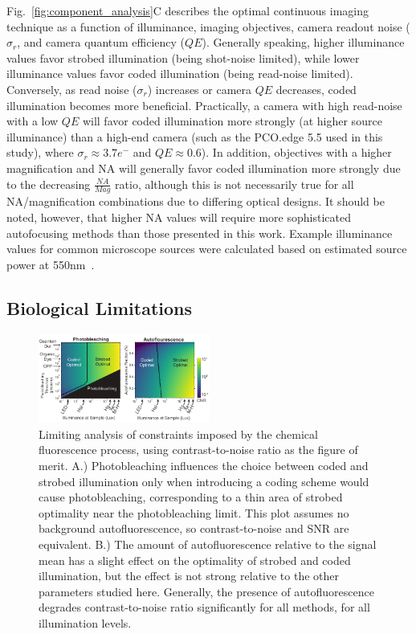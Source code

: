 Fig.~\ref{fig:component_analysis}C describes the optimal continuous imaging technique as a function of illuminance, imaging objectives, camera readout noise ($\sigma_r$, and camera quantum efficiency ($QE$). Generally speaking, higher illuminance values favor strobed illumination (being shot-noise limited), while lower illuminance values favor coded illumination (being read-noise limited). Conversely, as read noise ($\sigma_r$) increases or camera $QE$ decreases, coded illumination becomes more beneficial. Practically, a camera with high read-noise with a low $QE$ will favor coded illumination more strongly (at higher source illuminance) than a high-end camera (such as the PCO.edge 5.5 used in this study), where $\sigma_r \approx 3.7 e^-$ and $QE \approx 0.6$). In addition, objectives with a higher magnification and NA will generally favor coded illumination more strongly due to the decreasing $\frac{NA}{Mag}$ ratio, although this is not necessarily true for all NA/magnification combinations due to differing optical designs. It should be noted, however, that higher NA values will require more sophisticated autofocusing methods than those presented in this work. Example illuminance values for common microscope sources were calculated based on estimated source power at 550nm~\cite{illumpower}.

\subsection{Biological Limitations}

\begin{figure}
  \centering
    \includegraphics[width=0.5\textwidth]{figures/fig_highthroughput_fluorescence_analysis.pdf}
      \caption{\label{fig:fluorescence_analysis} Limiting analysis of constraints imposed by the chemical fluorescence process, using contrast-to-noise ratio as the figure of merit. A.) Photobleaching influences the choice between coded and strobed illumination only when introducing a coding scheme would cause photobleaching, corresponding to a thin area of strobed optimality near the photobleaching limit. This plot assumes no background autofluorescence, so contrast-to-noise and SNR are equivalent. B.) The amount of autofluorescence relative to the signal mean has a slight effect on the optimality of strobed and coded illumination, but the effect is not strong relative to the other parameters studied here. Generally, the presence of autofluorescence degrades contrast-to-noise ratio significantly for all methods, for all illumination levels.}
\end{figure}

